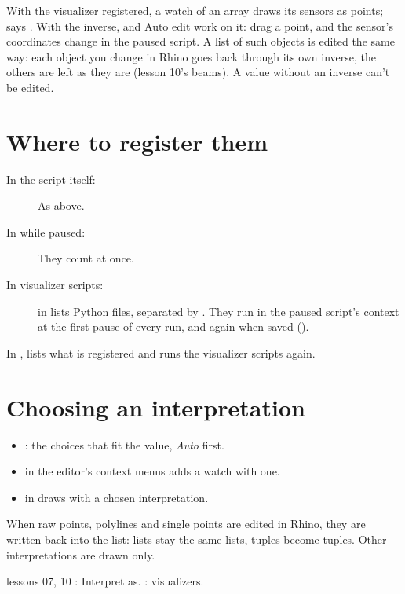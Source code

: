 With the visualizer registered, a watch of an array draws its sensors as points;  says
. With the inverse,  and Auto edit work on it: drag a
point, and the sensor's coordinates change in the paused script. A list of such objects is edited the
same way: each object you change in Rhino goes back through its own inverse, the others are left as they
are (lesson 10's beams). A value without an inverse can't be edited.

\section{Where to register them}

\begin{description}
  \item[In the script itself:] As above.
  \item[In  while paused:] They count at once.
  \item[In visualizer scripts:]  in  lists Python
        files, separated by \code{;}. They run in the paused script's context at the first pause of every run,
        and again when saved ().
\end{description}

In ,  lists what is registered and  runs the visualizer
scripts again.

\section{Choosing an interpretation}

\begin{itemize}
  \item {}: the choices that fit the value, \emph{Auto} first.
  \item {} in the editor's context menus adds a watch with one.
  \item {} in  draws with a chosen interpretation.
\end{itemize}

When raw points, polylines and single points are edited in Rhino, they are written back into the list:
lists stay the same lists, tuples become tuples. Other interpretations are drawn only.

\begin{lesson}{lessons 07, 10}
: Interpret as. : visualizers.
\end{lesson}
